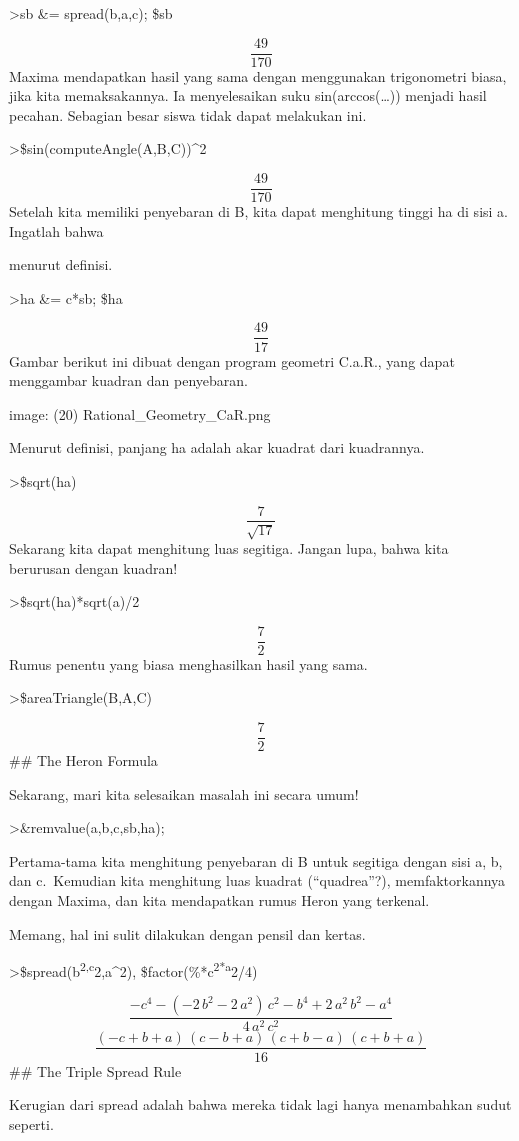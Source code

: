 \documentclass[
]{book}
\begin{document}
\textgreater sb \&= spread(b,a,c); \$sb

\[\frac{49}{170}\]Maxima mendapatkan hasil yang sama dengan menggunakan trigonometri biasa, jika kita memaksakannya. Ia menyelesaikan suku sin(arccos(\ldots)) menjadi hasil pecahan. Sebagian besar siswa tidak dapat melakukan ini.

\textgreater\$sin(computeAngle(A,B,C))\^{}2

\[\frac{49}{170}\]Setelah kita memiliki penyebaran di B, kita dapat menghitung tinggi ha di sisi a. Ingatlah bahwa

menurut definisi.

\textgreater ha \&= c*sb; \$ha

\[\frac{49}{17}\]Gambar berikut ini dibuat dengan program geometri C.a.R., yang dapat menggambar kuadran dan penyebaran.

image: (20) Rational\_Geometry\_CaR.png

Menurut definisi, panjang ha adalah akar kuadrat dari kuadrannya.

\textgreater\$sqrt(ha)

\[\frac{7}{\sqrt{17}}\]Sekarang kita dapat menghitung luas segitiga. Jangan lupa, bahwa kita berurusan dengan kuadran!

\textgreater\$sqrt(ha)*sqrt(a)/2

\[\frac{7}{2}\]Rumus penentu yang biasa menghasilkan hasil yang sama.

\textgreater\$areaTriangle(B,A,C)

\[\frac{7}{2}\]\#\# The Heron Formula

Sekarang, mari kita selesaikan masalah ini secara umum!

\textgreater\&remvalue(a,b,c,sb,ha);

Pertama-tama kita menghitung penyebaran di B untuk segitiga dengan sisi a, b, dan c.~Kemudian kita menghitung luas kuadrat (``quadrea''?), memfaktorkannya dengan Maxima, dan kita mendapatkan rumus Heron yang terkenal.

Memang, hal ini sulit dilakukan dengan pensil dan kertas.

\textgreater\$spread(b\textsuperscript{2,c}2,a\^{}2), \$factor(\%*c\textsuperscript{2*a}2/4)

\[\frac{-c^4-\left(-2\,b^2-2\,a^2\right)\,c^2-b^4+2\,a^2\,b^2-a^4}{4
 \,a^2\,c^2}\]\[\frac{\left(-c+b+a\right)\,\left(c-b+a\right)\,\left(c+b-a\right)\,
 \left(c+b+a\right)}{16}\]\#\# The Triple Spread Rule

Kerugian dari spread adalah bahwa mereka tidak lagi hanya menambahkan sudut seperti.
\end{document}
